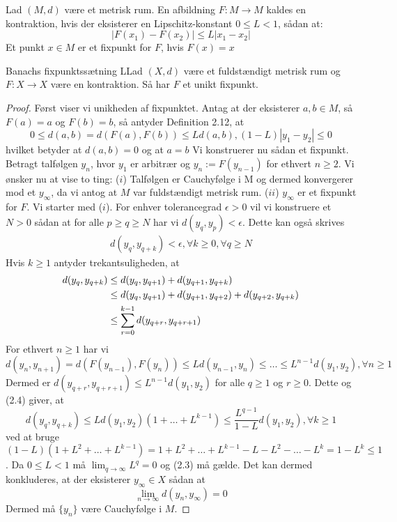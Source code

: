 \begin{definition}
Lad $(M,d)$ være et metrisk rum. En afbildning $F:M\rightarrow M$ kaldes en kontraktion, hvis der eksisterer en Lipschitz-konstant $0 \leq L < 1$, sådan at: \hfill \break
$$|F(x_1)-F(x_2)|\leq L|x_1-x_2|$$
Et punkt $x \in M$ er et fixpunkt for $F$, hvis $F(x)=x$ 
\end{definition}

\begin{mytheo}{Banachs fixpunktssætning}
LLad $(X,d)$ være et fuldstændigt metrisk rum og $F:X\rightarrow X$ være en kontraktion. Så har $F$ et unikt fixpunkt.
\end{mytheo}

\begin{proof}
Først viser vi unikheden af fixpunktet. Antag at der eksisterer $a,b \in M$, så $F(a)=a$ og $F(b)=b$, så antyder Definition 2.12, at \hfill \break
$$0\leq d(a,b)=d(F(a),F(b))\leq Ld(a,b), (1-L)|y_1-y_2|\leq 0$$
hvilket betyder at $d(a,b)=0$ og at $a=b$ \hfill \break
\hfill \break
Vi konstruerer nu sådan et fixpunkt. Betragt talfølgen ${y_n}$, hvor $y_1$ er arbitrær og $y_n:=F(y_{n-1})$ for ethvert $n\geq 2$. Vi ønsker nu at vise to ting:\hfill \break
 ($i$) Talfølgen er Cauchyfølge i M og dermed konvergerer mod et $y_\infty$, da vi antog at $M$ var fuldstændigt metrisk rum.\hfill  \break
($ii$) $y_\infty$ er et fixpunkt for $F$. \hfill \break
Vi starter med ($i$). For enhver tolerancegrad $\epsilon > 0$ vil vi konstruere et $N > 0$ sådan at for alle $p\geq q \geq N$ har vi $d(y_q,y_p)<\epsilon$. Dette kan også skrives \hfill \break
\begin{align}
d(y_q,y_{q+k})<\epsilon,  \forall k \geq 0, \forall q \geq N
\end{align}
Hvis $k \geq 1$ antyder trekantsuligheden, at \hfill \break
\begin{align}
d(y_q,y_{q+k}) &\leq d(y_{q},y_{q+1})+d(y_{q+1},y_{q+k}) \notag\\
&\leq d(y_q,y_{q+1})+d(y_{q+1},y_{q+2})+d(y_{q+2},y_{q+k}) \notag\\
&\leq \sum\limits_{r=0}^{k-1} d(y_{q+r},y_{q+r+1})
\end{align}
For ethvert $n\geq 1$ har vi \hfill \break
$$d(y_n,y_{n+1})=d(F(y_{n-1}),F(y_n)) \leq Ld(y_{n-1},y_n) \leq \hdots \leq L^{n-1}d(y_1,y_2), \forall n \geq 1$$
Dermed er $d(y_{q+r},y_{q+r+1}) \leq L^{n-1}d(y_1,y_2)$ for alle $q \geq 1$ og $r\geq 0$. Dette og (2.4) giver, at \hfill \break
$$d(y_q,y_{q+k}) \leq L d(y_1,y_2)(1+\hdots+L^{k-1}) \leq \frac{L^{q-1}}{1-L}d(y_1,y_2), \forall k \geq 1$$
ved at bruge $(1-L)(1+L^2+\hdots+L^{k-1})=1+L^2+\hdots +L^{k-1}-L-L^2-\hdots -L^k= 1-L^k \leq 1$. \hfill \break
Da $0 \leq L < 1$ må $\lim_{q\rightarrow\infty} L^q=0$ og (2.3) må gælde. Det kan dermed konkluderes, at der eksisterer $y_\infty \in X$ sådan at \hfill \break
$$\lim_{n \to \infty} d(y_n,y_\infty)=0$$
Dermed må $\{y_n\}$ være Cauchyfølge i $M$. \hfill \break


\end{proof}
